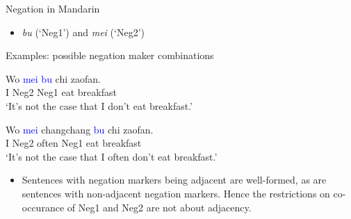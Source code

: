 \documentclass[professionalfonts, xcolor={usenames,svgnames,x11names,table}]{beamer}
\begin{document}
\begin{frame}{Negation in Mandarin}

 \begin{itemize}
        \item \textit{bu} (`Neg1') and \textit{mei} (`Neg2')      
    \end{itemize}
    
\begin{exampleblock}{Examples: possible negation maker combinations}
\pause
 \begin{exe}
   \ex \gll Wo  \textcolor{blue}{mei}  \textcolor{blue}{bu}  chi  zaofan. \\
                     I  Neg2  Neg1  eat  breakfast \\
                \glt `It's not the case that I don't eat breakfast.'
    \pause

     \ex \gll Wo  \textcolor{blue}{mei}  changchang  \textcolor{blue}{bu}  chi  zaofan. \\
                     I  Neg2  often  Neg1  eat  breakfast \\
                \glt `It's not the case that I often don't eat breakfast.' 
\end{exe} 
\pause
\begin{itemize}
\item \textcolor{cadmiumgreen}{Sentences with negation markers being adjacent are well-formed, as are sentences with non-adjacent negation markers. Hence the restrictions on co-occurance of Neg1 and Neg2 are not about adjacency.}
\end{itemize}  
\end{exampleblock}
\end{frame}
\end{document}
